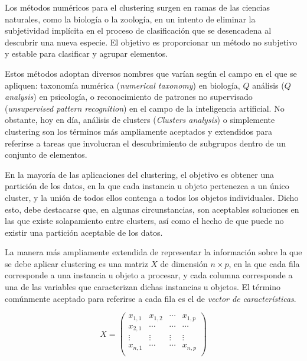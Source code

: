 Los métodos numéricos para el clustering surgen en ramas de las ciencias naturales, como la biología o la zoología, en un intento de eliminar la subjetividad implícita en el proceso de clasificación que se desencadena al descubrir una nueva especie. El objetivo es proporcionar un método no subjetivo y estable para clasificar y agrupar elementos.

Estos métodos adoptan diversos nombres que varían según el campo en el que se apliquen: taxonomía numérica (\textit{numerical taxonomy}) en biología, $Q$ análisis (\textit{$Q$ analysis}) en psicología, o reconocimiento de patrones no supervisado (\textit{unsupervised pattern recognition}) en el campo de la inteligencia artificial. No obstante, hoy en día, análisis de clusters (\textit{Clusters analysis}) o simplemente clustering son los términos más ampliamente aceptados y extendidos para referirse a tareas que involucran el descubrimiento de subgrupos dentro de un conjunto de elementos.

En la mayoría de las aplicaciones del clustering, el objetivo es obtener una partición de los datos, en la que cada instancia u objeto pertenezca a un único cluster, y la unión de todos ellos contenga a todos los objetos individuales. Dicho esto, debe destacarse que, en algunas circunstancias, son aceptables soluciones en las que existe solapamiento entre clusters, así como el hecho de que puede no existir una partición aceptable de los datos.

La manera más ampliamente extendida de representar la información sobre la que se debe aplicar clustering es una matriz $X$ de dimensión $n\times p$, en la que cada fila corresponde a una instancia u objeto a procesar, y cada columna corresponde a una de las variables que caracterizan dichas instancias u objetos. El término comúnmente aceptado para referirse a cada fila es el de \textit{vector de características}.


$$ X = \left( \begin{array}{cccc}

x_{1,1} & x_{1,2} & \cdots & x_{1,p} \\

x_{2,1} & \cdots & \cdots & \cdots  \\

\vdots & \vdots & \vdots & \vdots \\

x_{n,1} & \cdots & \cdots & x_{n,p} \\

\end{array} \right) $$

